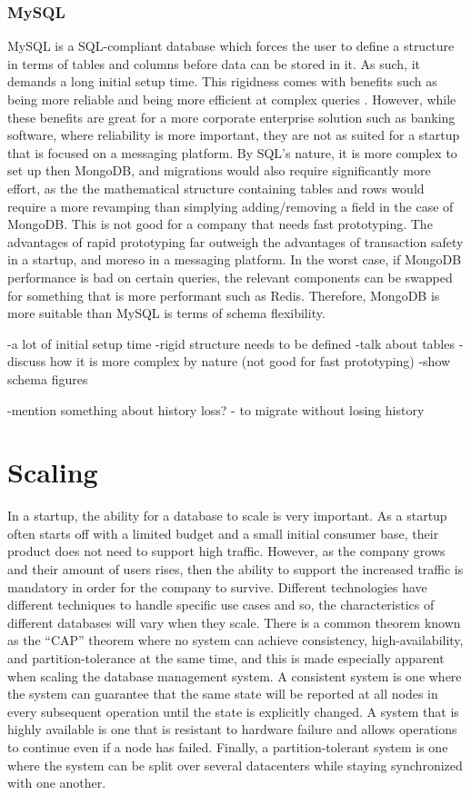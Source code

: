 \documentclass[12pt]{article}
\begin{document}
\subsubsection{MySQL}
MySQL is a SQL-compliant database which forces the user to define a structure in terms of tables and columns before data can be stored in it. As such, it demands a long initial setup time. This rigidness comes with benefits such as being more reliable and being more efficient at complex queries \cite{sql_vs_nosql}. However, while these benefits are great for a more corporate enterprise solution such as banking software, where reliability is more important, they are not as suited for a startup that is focused on a messaging platform. By SQL's nature, it is more complex to set up then MongoDB, and migrations would also require significantly more effort, as the the mathematical structure containing tables and rows would require a more revamping than simplying adding/removing a field in the case of MongoDB. This is not good for a company that needs fast prototyping. The advantages of rapid prototyping far outweigh the advantages of transaction safety in a startup, and moreso in a messaging platform. In the worst case, if MongoDB performance is bad on certain queries, the relevant components can be swapped for something that is more performant such as Redis. Therefore, MongoDB is more suitable than MySQL is terms of schema flexibility.

-a lot of initial setup time
-rigid structure needs to be defined
-talk about tables
-discuss how it is more complex by nature (not good for fast prototyping)
-show schema figures

-mention something about history loss? - to migrate without losing history

\section{Scaling}

In a startup, the ability for a database to scale is very important. As a startup often starts off with a limited budget and a small initial consumer base, their product does not need to support high traffic. However, as the company grows and their amount of users rises, then the ability to support the increased traffic is mandatory in order for the company to survive. Different technologies have different techniques to handle specific use cases and so, the characteristics of different databases will vary when they scale. There is a common theorem known as the ``CAP'' theorem where no system can achieve consistency, high-availability, and partition-tolerance at the same time, and this is made especially apparent when scaling the database management system. A consistent system is one where the system can guarantee that the same state will be reported at all nodes in every subsequent operation until the state is explicitly changed. A system that is highly available is one that is resistant to hardware failure and allows operations to continue even if a node has failed. Finally, a partition-tolerant system is one where the system can be split over several datacenters while staying synchronized with one another. \cite{cap_theorem}
\end{document}

